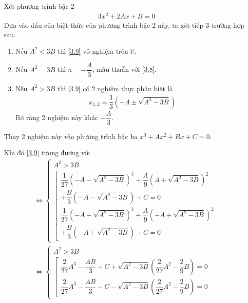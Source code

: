 \documentclass[a4paper,oneside]{book}
\numberwithin{equation}{chapter}
\begin{document}
Xét phương trình bậc 2
\begin{align}
3{x^2} + 2Ax + B = 0
 \end{align}
Dựa vào dấu của biệt thức của phương trình bậc 2 này, ta xét tiếp 3 trường hợp sau.
\begin{enumerate}
\item Nếu ${A^2} < 3B$ thì \eqref{3.9} vô nghiệm trên $\mathbb{R}$.
\item Nếu ${A^2} = 3B$ thì $a =  - \dfrac{A}{3}$, mâu thuẫn với \eqref{3.8}.
\item Nếu ${A^2} > 3B$ thì \eqref{3.9} có 2 nghiệm thực phân biệt là
\begin{align}
{x_{1,2}} = \dfrac{1}{3}\left( { - A \pm \sqrt {{A^2} - 3B} } \right)
\end{align}
Rõ ràng 2 nghiệm này khác $ - \dfrac{A}{3}$.
\end{enumerate}

Thay 2 nghiệm này vào phương trình bậc ba ${x^3} + A{x^2} + Bx + C = 0$.

Khi đó \eqref{3.9} tương đương với
\begin{align}
\label{3.12}
 \Leftrightarrow \left\{ {\begin{array}{*{20}{c}}
{{A^2} > 3B}\\
{\left[ {\begin{array}{*{20}{c}}
\dfrac{1}{{27}}{{\left( { - A - \sqrt {{A^2} - 3B} } \right)}^3} + \dfrac{A}{9}{{\left( {A + \sqrt {{A^2} - 3B} } \right)}^2} \\
+ \dfrac{B}{3}\left( { - A - \sqrt {{A^2} - 3B} } \right) + C = 0\\
\dfrac{1}{{27}}{{\left( { - A + \sqrt {{A^2} - 3B} } \right)}^3} + \dfrac{A}{9}{{\left( { - A + \sqrt {{A^2} - 3B} } \right)}^2} \\+ \dfrac{B}{3}\left( { - A + \sqrt {{A^2} - 3B} } \right) + C = 0
\end{array}} \right.}
\end{array}} \right.\\
 \Leftrightarrow \left\{ {\begin{array}{*{20}{c}}
{{A^2} > 3B}\\
{\left[ {\begin{array}{*{20}{c}}
{\dfrac{2}{{27}}{A^3} - \dfrac{{AB}}{3} + C + \sqrt {{A^2} - 3B} \left( {\dfrac{2}{{27}}{A^2} - \dfrac{2}{9}B} \right) = 0}\\
{\dfrac{2}{{27}}{A^3} - \dfrac{{AB}}{3} + C - \sqrt {{A^2} - 3B} \left( {\dfrac{2}{{27}}{A^2} - \dfrac{2}{9}B} \right) = 0}
\end{array}} \right.}
\end{array}} \right.
\end{align}
\end{document}

